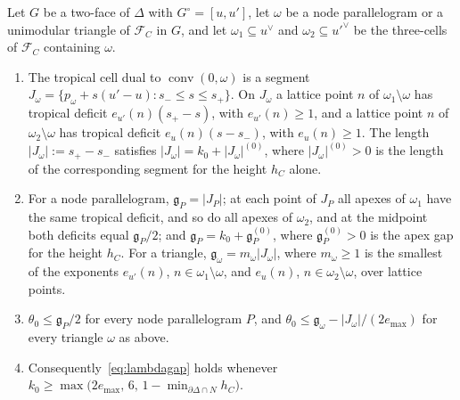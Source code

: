 \begin{lemma}\label{lem:gaps}
Let $G$ be a two-face of $\Delta$ with $G^\circ=[u,u']$, let $\omega$ be a node parallelogram or a unimodular triangle of
$\mathcal F_C$ in $G$, and let $\omega_1\subseteq u^\vee$ and $\omega_2\subseteq u'^\vee$ be the three-cells of $\mathcal F_C$
containing $\omega$.
\begin{enumerate}
\item The tropical cell dual to $\operatorname{conv}(0,\omega)$ is a segment $J_\omega=\{p_\omega+s(u'-u):s_-\le s\le s_+\}$. On
$J_\omega$ a lattice point $n$ of $\omega_1\setminus\omega$ has tropical deficit $e_{u'}(n)(s_+-s)$, with $e_{u'}(n)\ge1$, and a
lattice point $n$ of $\omega_2\setminus\omega$ has tropical deficit $e_u(n)(s-s_-)$, with $e_u(n)\ge1$. The length
$|J_\omega|:=s_+-s_-$ satisfies $|J_\omega|=k_0+|J_\omega|^{(0)}$, where $|J_\omega|^{(0)}>0$ is the length of the corresponding
segment for the height $h_C$ alone.
\item For a node parallelogram, $\mathfrak g_P=|J_P|$; at each point of $J_P$ all apexes of $\omega_1$ have the same
tropical deficit, and so do all apexes of $\omega_2$, and at the midpoint both deficits equal $\mathfrak g_P/2$; and
$\mathfrak g_P=k_0+\mathfrak g_P^{(0)}$, where $\mathfrak g_P^{(0)}>0$ is the apex gap for the height $h_C$. For a
triangle, $\mathfrak g_\omega=m_\omega|J_\omega|$, where $m_\omega\ge1$ is the smallest of the exponents $e_{u'}(n)$,
$n\in\omega_1\setminus\omega$, and $e_u(n)$, $n\in\omega_2\setminus\omega$, over lattice points.
\item $\theta_0\le\mathfrak g_P/2$ for every node parallelogram $P$, and $\theta_0\le\mathfrak g_\omega-|J_\omega|/(2e_{\max})$
for every triangle $\omega$ as above.
\item Consequently~\eqref{eq:lambdagap} holds whenever
$k_0\ge\max\bigl(2e_{\max},\,6,\,1-\min_{\partial\Delta\cap N}h_C\bigr)$.
\end{enumerate}
\end{lemma}

